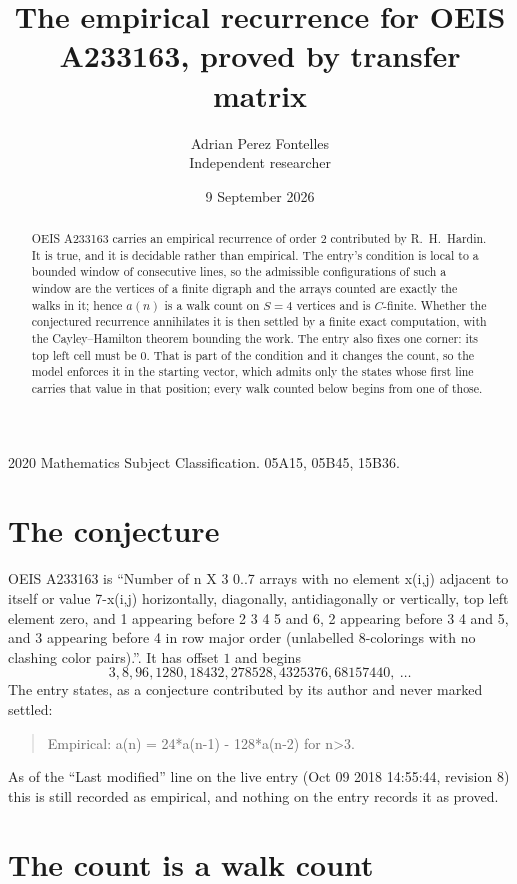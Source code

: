 \documentclass[11pt,a4paper]{article}
\title{The empirical recurrence for OEIS A233163, proved by transfer matrix}
\author{Adrian Perez Fontelles\\ \small Independent researcher}
\date{9 September 2026}
\theoremstyle{plain}
\theoremstyle{definition}
\begin{document}
\maketitle

\begin{abstract}
OEIS A233163 carries an empirical recurrence of order $2$ contributed by R.~H.~Hardin. It is
true, and it is decidable rather than empirical. The entry's condition is local to a bounded window of consecutive lines, so
the admissible configurations of such a window are the vertices of a finite digraph and the
arrays counted are exactly the walks in it; hence $a(n)$ is a walk count on $S=4$ vertices
and is $C$-finite. Whether the conjectured recurrence annihilates it is then settled by a
finite exact computation, with the Cayley--Hamilton theorem bounding the work.
 The entry also fixes one corner: its top left cell must be $0$. That is part of the condition and it changes the count, so the model enforces it in the starting vector, which admits only the states whose first line carries that value in that position; every walk counted below begins from one of those.\end{abstract}

\noindent\small 2020 Mathematics Subject Classification. 05A15, 05B45, 15B36.\normalsize

\section{The conjecture}

OEIS A233163 is ``Number of n X 3 0..7 arrays with no element x(i,j) adjacent to itself or value 7-x(i,j) horizontally, diagonally, antidiagonally or vertically, top left element zero, and 1 appearing before 2 3 4 5 and 6, 2 appearing before 3 4 and 5, and 3 appearing before 4 in row major order (unlabelled 8-colorings with no clashing color pairs).''. It has offset $1$ and begins
\[
3, 8, 96, 1280, 18432, 278528, 4325376, 68157440,\ \dots
\]
The entry states, as a conjecture contributed by its author and never marked settled:
\begin{quote}
Empirical: a(n) = 24*a(n-1) - 128*a(n-2) for n>3.
\end{quote}
As of the ``Last modified'' line on the live entry (Oct 09 2018 14:55:44, revision 8) this is still
recorded as empirical, and nothing on the entry records it as proved.

\section{The count is a walk count}
\end{document}

